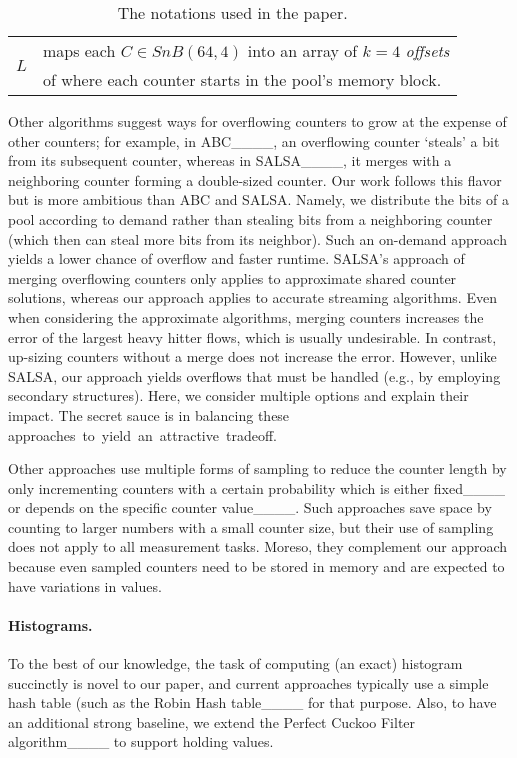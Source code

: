 \begin{table}[t]
{\begin{tabular}{|c||l|}
\multirow{2}{*}{$L$} & maps each $C\in SnB(64,4)$ into an array of $k=4$ \emph{offsets}\\ & of where each counter starts in the pool's memory block.                                                    \\ \hline
\end{tabular}
}
\vspace{0mm}
\caption{The notations used in the paper.}\label{tbl:notations}
\vspace{-4mm}
\end{table}

Other algorithms suggest ways for overflowing counters to grow at the expense of other counters; for example, in ABC____, an overflowing counter `steals' a bit from its subsequent counter, whereas in SALSA____, it merges with a neighboring counter forming a double-sized counter. Our work follows this flavor but is more ambitious than ABC and SALSA. Namely, we distribute the bits of a pool according to demand rather than stealing bits from a neighboring counter (which then can steal more bits from its neighbor). Such an on-demand approach yields a lower chance of overflow and faster runtime. SALSA's approach of merging overflowing counters only applies to approximate shared counter solutions, whereas our approach applies to accurate streaming algorithms. Even when considering the approximate algorithms, merging counters increases the error of the largest heavy hitter flows, which is usually undesirable.
In contrast,  up-sizing counters without a merge does not increase the error. However, unlike SALSA, our approach yields overflows that must be handled (e.g., by employing secondary structures). Here, we consider multiple options and explain their impact. The secret sauce is in balancing these \mbox{approaches to yield an attractive tradeoff. }

Other approaches use multiple forms of sampling to reduce the counter length by only incrementing counters with a certain probability which is either fixed____ or depends on the specific counter value____. Such approaches save space by counting to larger numbers with a small counter size, but their use of sampling does not apply to all measurement tasks. Moreso, they complement our approach because even sampled counters need to be stored in memory and are expected to have variations in values.

\paragraph{\textbf{Histograms.}} To the best of our knowledge, the task of computing (an exact) histogram succinctly is novel to our paper, and current approaches typically use a simple hash table (such as the Robin Hash table____ for that purpose. Also, to have an additional strong baseline, we extend the Perfect Cuckoo Filter algorithm____ to support holding values.